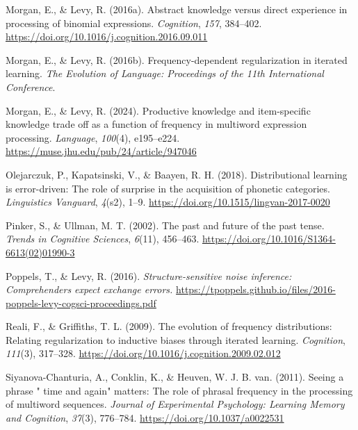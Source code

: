 \documentclass[
  12pt,
]{scrartcl}
\newlength{\cslhangindent}
\newenvironment{CSLReferences}[2] %
 {\begin{list}{}{%
  \setlength{\itemindent}{0pt}
  \setlength{\leftmargin}{0pt}
  \setlength{\parsep}{0pt}
  \ifodd #1
   \setlength{\leftmargin}{\cslhangindent}
   \setlength{\itemindent}{-1\cslhangindent}
  \fi
  \setlength{\itemsep}{#2\baselineskip}}}
 {\end{list}}
\begin{document}
\begin{CSLReferences}{1}{0}
Morgan, E., \& Levy, R. (2016a). Abstract knowledge versus direct
experience in processing of binomial expressions. \emph{Cognition},
\emph{157}, 384--402.
\url{https://doi.org/10.1016/j.cognition.2016.09.011}

Morgan, E., \& Levy, R. (2016b). Frequency-dependent regularization in
iterated learning. \emph{The Evolution of Language: Proceedings of the
11th International Conference}.

Morgan, E., \& Levy, R. (2024). Productive knowledge and item-specific
knowledge trade off as a function of frequency in multiword expression
processing. \emph{Language}, \emph{100}(4), e195--e224.
\url{https://muse.jhu.edu/pub/24/article/947046}

Olejarczuk, P., Kapatsinski, V., \& Baayen, R. H. (2018). Distributional
learning is error-driven: The role of surprise in the acquisition of
phonetic categories. \emph{Linguistics Vanguard}, \emph{4}(s2), 1--9.
\url{https://doi.org/10.1515/lingvan-2017-0020}

Pinker, S., \& Ullman, M. T. (2002). The past and future of the past
tense. \emph{Trends in Cognitive Sciences}, \emph{6}(11), 456--463.
\url{https://doi.org/10.1016/S1364-6613(02)01990-3}

Poppels, T., \& Levy, R. (2016). \emph{Structure-sensitive noise
inference: Comprehenders expect exchange errors.}
\url{https://tpoppels.github.io/files/2016-poppels-levy-cogsci-proceedings.pdf}

Reali, F., \& Griffiths, T. L. (2009). The evolution of frequency
distributions: Relating regularization to inductive biases through
iterated learning. \emph{Cognition}, \emph{111}(3), 317--328.
\url{https://doi.org/10.1016/j.cognition.2009.02.012}

Siyanova-Chanturia, A., Conklin, K., \& Heuven, W. J. B. van. (2011).
Seeing a phrase {"} time and again{"} matters: The role of phrasal
frequency in the processing of multiword sequences. \emph{Journal of
Experimental Psychology: Learning Memory and Cognition}, \emph{37}(3),
776--784. \url{https://doi.org/10.1037/a0022531}


\end{CSLReferences}
\end{document}
